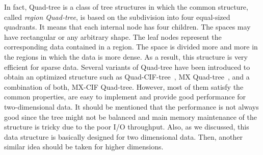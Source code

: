 \documentclass[a4paper,12pt]{article}
\begin{document}
In fact, Quad-tree is a class of tree structures in which the common structure, called \textit{region Quad-tree}, is based on the subdivision into four equal-sized quadrants. It means that each internal node has four children. The spaces may have rectangular or any arbitrary shape. The leaf nodes represent the corresponding data contained in a region. The space is divided more and more in the regions in which the data is more dense. As a result, this structure is very efficient for sparse data.
Several variants of Quad-tree have been introduced to obtain an optimized structure such as Quad-CIF-tree~\cite{quadcif}, MX Quad-tree~\cite{quadmx}, and a combination of both, MX-CIF Quad-tree. However, most of them satisfy the common properties, are easy to implement and provide good performance for two-dimensional data.
It should be mentioned that the performance is not always good since the tree might not be balanced and main memory maintenance of the structure is tricky due to the poor I/O throughput. Also, as we discussed, this data structure is basically designed for two dimensional data. Then, another similar idea should be taken for higher dimensions.
\end{document}

